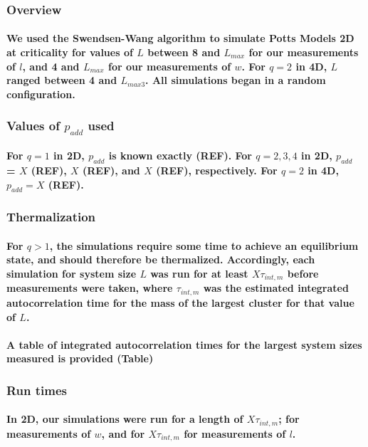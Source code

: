 \documentclass{umthesis}
\begin{document}
\subsubsection{Overview}
\label{sec-3.2.5.1}
\paragraph{We used the Swendsen-Wang algorithm to simulate Potts Models 2D at criticality for values of $L$ between 8 and $L_{max}$ for our  measurements of $l$, and 4 and $L_{max}$ for our measurements of $w$.  For $q=2$ in 4D, $L$ ranged between 4 and $L_{max3}$.  All simulations began in a random configuration.}
\label{sec-3.2.5.1.1}
\subsubsection{Values of $p_{add}$ used}
\label{sec-3.2.5.2}
\paragraph{For $q=1$ in 2D, $p_{add}$ is known exactly (REF).  For $q=2,3,4$ in 2D, $p_{add}$ = $X$ (REF), $X$ (REF), and $X$ (REF), respectively. For $q=2$ in 4D, $p_{add}=X$ (REF).}
\label{sec-3.2.5.2.1}
\subsubsection{Thermalization}
\label{sec-3.2.5.3}
\paragraph{For $q>1$, the simulations require some time to achieve an equilibrium state, and should therefore be thermalized. Accordingly, each simulation for system size $L$ was run for at least $X \tau_{int,m}$ before measurements were taken, where $\tau_{int,m}$ was the estimated integrated autocorrelation time for the mass of the largest cluster for that value of $L$.}
\label{sec-3.2.5.3.1}
\paragraph{A table of integrated autocorrelation times for the largest system sizes measured is provided (Table)}
\label{sec-3.2.5.3.2}
\subsubsection{Run times}
\label{sec-3.2.5.4}
\paragraph{In 2D, our simulations were run for a length of $X \tau_{int,m}$; for measurements of $w$, and for $X  \tau_{int,m}$ for measurements of $l$.}
\label{sec-3.2.5.4.1}
\end{document}
